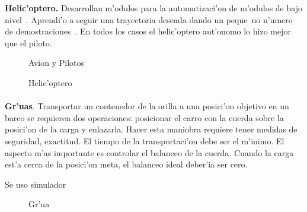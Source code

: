 \documentclass[11pt]{article}
\begin{document}
\textbf{Helic'optero.} Desarrollan m'odulos para la automatizaci'on de m'odulos de bajo nivel~\cite{Buskey03c}. Aprendi'o a seguir una trayectoria deseada dando un peque~no n'umero de demostraciones~\cite{heliCoates}. En todos los casos el helic'optero aut'onomo lo hizo mejor que el piloto.

\begin{figure}[h]
\begin{center}

\caption{Avion y Pilotos}
  \label{fig:volar}
\end{center}
\end{figure} 

\begin{figure}[h]

\centering
{}
\caption[Helic'optero]{Helic'optero} 
\label{fig:helicoptero}

\end{figure}

\paragraph{}
\noindent
\textbf{Gr'uas}. Transportar un contenedor de la orilla a una posici'on objetivo en un barco se requieren dos operaciones: posicionar el carro con la cuerda sobre la posici'on de la carga y enlazarla. Hacer esta maniobra requiere tener medidas de seguridad, exactitud. El tiempo de la transportaci'on debe ser el m'inimo. El aspecto m'as importante es controlar el balanceo de la cuerda. Cuando la carga est'a cerca de la posici'on meta, el balanceo ideal deber'ia ser cero.

Se uso simulador~\cite{DBLP:journals/etai/SucB99}

\begin{figure}[h]

\centering
{}
\caption[Gr'ua]{Gr'ua} 
\label{fig:grua}

\end{figure}
\end{document}
